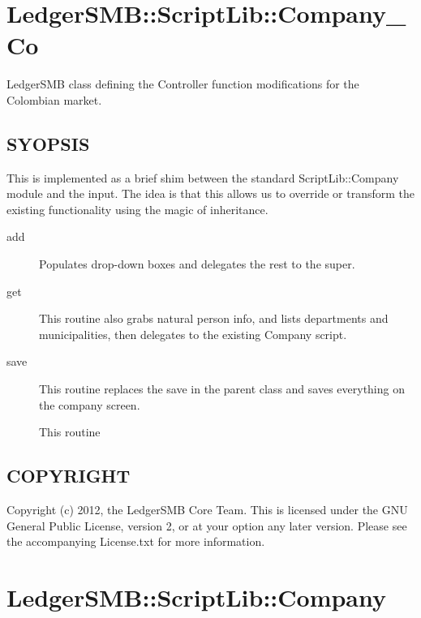 \section{LedgerSMB::ScriptLib::Company\_Co\label{LedgerSMB::ScriptLib::Company_Co}}


LedgerSMB class defining the Controller
function modifications for the Colombian market.

\subsection*{SYOPSIS\label{LedgerSMB::ScriptLib::Company_Co_SYOPSIS}}


This is implemented as a brief shim between the standard ScriptLib::Company 
module and the input.  The idea is that this allows us to override or transform
the existing functionality using the magic of inheritance.

\begin{description}

\item[{add}] \mbox{}

Populates drop-down boxes and delegates the rest to the super.


\item[{get}] \mbox{}

This routine also grabs natural person info, and lists departments and 
municipalities, then delegates to the existing Company script.


\item[{save}] \mbox{}

This routine replaces the save in the parent class and saves everything on the 
company screen.



This routine

\end{description}
\subsection*{COPYRIGHT\label{LedgerSMB::ScriptLib::Company_Co_COPYRIGHT}}


Copyright (c) 2012, the LedgerSMB Core Team.  This is licensed under the GNU 
General Public License, version 2, or at your option any later version.  Please 
see the accompanying License.txt for more information.

\section{LedgerSMB::ScriptLib::Company\label{LedgerSMB::ScriptLib::Company}}


